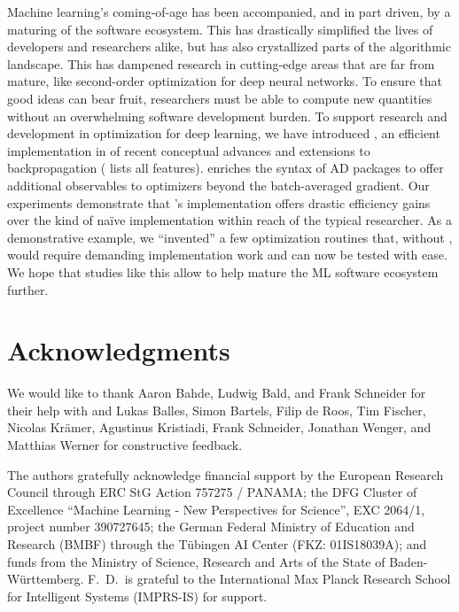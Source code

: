 Machine learning's coming-of-age has been accompanied, and in part driven, by a
maturing of the software ecosystem. This has drastically simplified the lives of
developers and researchers alike, but has also crystallized parts of the
algorithmic landscape. This has dampened research in cutting-edge areas that are
far from mature, like second-order optimization for deep neural networks. To
ensure that good ideas can bear fruit, researchers must be able to compute new
quantities without an overwhelming software development burden. To support
research and development in optimization for deep learning, we have introduced
\BackPACK, an efficient implementation in \PyTorch of recent conceptual advances
and extensions to backpropagation ( lists
all features). \BackPACK enriches the syntax of AD packages to offer additional
observables to optimizers beyond the batch-averaged gradient. Our experiments
demonstrate that \BackPACK's implementation offers drastic efficiency gains over
the kind of na\"ive implementation within reach of the typical researcher. As a
demonstrative example, we ``invented'' a few optimization routines that, without
\BackPACK, would require demanding implementation work and can now be tested
with ease. We hope that studies like this allow \BackPACK to help mature the ML
software ecosystem further.

\section*{Acknowledgments}

We would like to thank Aaron Bahde, Ludwig Bald, and Frank Schneider for their help
with \DeepOBS and Lukas Balles, Simon Bartels, Filip de Roos, Tim Fischer,
Nicolas Kr\"amer, Agustinus Kristiadi, Frank Schneider, Jonathan Wenger, and
Matthias Werner for constructive feedback.


The authors gratefully acknowledge financial support by the European Research Council through ERC StG Action 757275 / PANAMA; the DFG Cluster of Excellence “Machine Learning - New Perspectives for Science”, EXC 2064/1, project number 390727645; the German Federal Ministry of Education and Research (BMBF) through the T\"ubingen AI Center (FKZ: 01IS18039A); and funds from the Ministry of Science, Research and Arts of the State of Baden-W\"urttemberg. F.\ D.\ is grateful to the International Max Planck Research School for Intelligent Systems (IMPRS-IS) for support.

